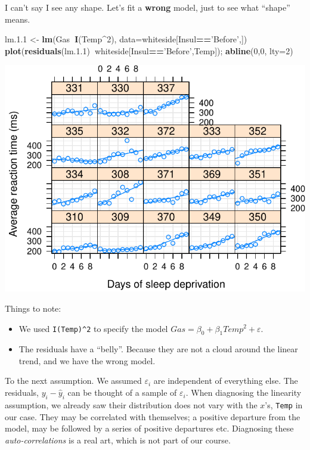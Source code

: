 \documentclass[]{book}
\newenvironment{Shaded}{\begin{snugshade}}{\end{snugshade}}
\newcommand{\KeywordTok}[1]{\textcolor[rgb]{0.13,0.29,0.53}{\textbf{#1}}}
\newcommand{\DataTypeTok}[1]{\textcolor[rgb]{0.13,0.29,0.53}{#1}}
\newcommand{\DecValTok}[1]{\textcolor[rgb]{0.00,0.00,0.81}{#1}}
\newcommand{\FloatTok}[1]{\textcolor[rgb]{0.00,0.00,0.81}{#1}}
\newcommand{\StringTok}[1]{\textcolor[rgb]{0.31,0.60,0.02}{#1}}
\newcommand{\OperatorTok}[1]{\textcolor[rgb]{0.81,0.36,0.00}{\textbf{#1}}}
\newcommand{\NormalTok}[1]{#1}
\providecommand{\tightlist}{%
  \setlength{\itemsep}{0pt}\setlength{\parskip}{0pt}}
\theoremstyle{definition}
\theoremstyle{definition}
\theoremstyle{definition}
\theoremstyle{remark}
\begin{document}
I can't say I see any shape. Let's fit a \textbf{wrong} model, just to
see what ``shape'' means.

\begin{Shaded}
\begin{Highlighting}[]
\NormalTok{lm.}\FloatTok{1.1}\NormalTok{ <-}\StringTok{ }\KeywordTok{lm}\NormalTok{(Gas}\OperatorTok{~}\KeywordTok{I}\NormalTok{(Temp}\OperatorTok{^}\DecValTok{2}\NormalTok{), }\DataTypeTok{data=}\NormalTok{whiteside[Insul}\OperatorTok{==}\StringTok{'Before'}\NormalTok{,])}
\KeywordTok{plot}\NormalTok{(}\KeywordTok{residuals}\NormalTok{(lm.}\FloatTok{1.1}\NormalTok{)}\OperatorTok{~}\NormalTok{whiteside[Insul}\OperatorTok{==}\StringTok{'Before'}\NormalTok{,Temp]); }\KeywordTok{abline}\NormalTok{(}\DecValTok{0}\NormalTok{,}\DecValTok{0}\NormalTok{, }\DataTypeTok{lty=}\DecValTok{2}\NormalTok{)}
\end{Highlighting}
\end{Shaded}

\includegraphics[width=0.5\linewidth]{Rcourse_files/figure-latex/unnamed-chunk-162-1}

Things to note:

\begin{itemize}
\tightlist
\item
  We used \texttt{I(Temp)\^{}2} to specify the model
  \(Gas=\beta_0 + \beta_1 Temp^2+ \varepsilon\).
\item
  The residuals have a ``belly''. Because they are not a cloud around
  the linear trend, and we have the wrong model.
\end{itemize}

To the next assumption. We assumed \(\varepsilon_i\) are independent of
everything else. The residuals, \(y_i-\hat y_i\) can be thought of a
sample of \(\varepsilon_i\). When diagnosing the linearity assumption,
we already saw their distribution does not vary with the \(x\)'s,
\texttt{Temp} in our case. They may be correlated with themselves; a
positive departure from the model, may be followed by a series of
positive departures etc. Diagnosing these \emph{auto-correlations} is a
real art, which is not part of our course.
\end{document}
